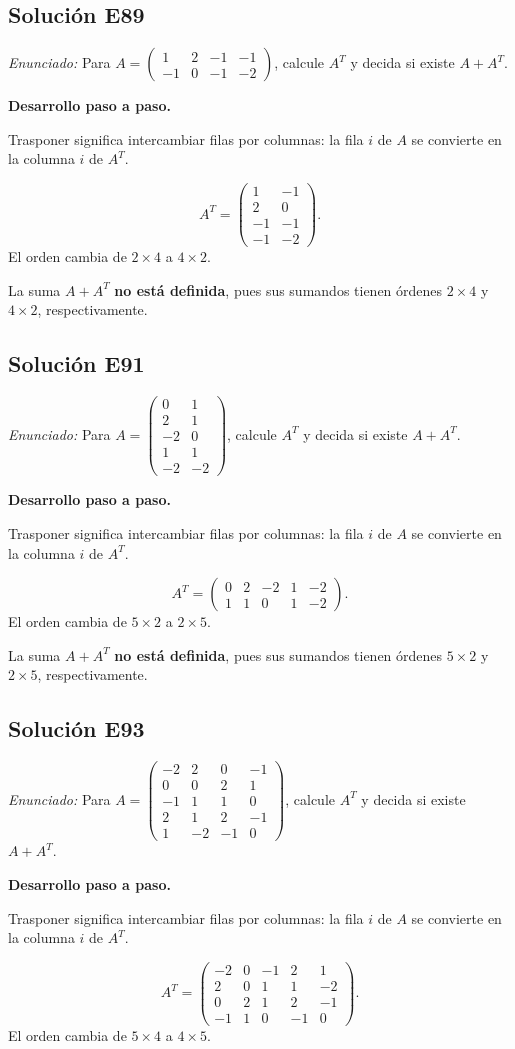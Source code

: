 \documentclass[12pt]{article}
\theoremstyle{remark}
\newcommand{\solucion}[2]{\Needspace{11\baselineskip}\subsection*{Solución E#1}\noindent\textit{Enunciado:} #2\par\medskip\noindent\textbf{Desarrollo paso a paso.}\par\medskip}
\begin{document}
\medskip

\solucion{89}{Para $A=\begin{pmatrix}1&2&-1&-1\\-1&0&-1&-2\end{pmatrix}$, calcule $A^T$ y decida si existe $A+A^T$.}
Trasponer significa intercambiar filas por columnas: la fila $i$ de $A$ se convierte en la columna $i$ de $A^T$.

\[
A^T=\begin{pmatrix}1&-1\\2&0\\-1&-1\\-1&-2\end{pmatrix}.
\]
El orden cambia de $2\times4$ a $4\times2$.

La suma $A+A^T$ \textbf{no está definida}, pues sus sumandos tienen órdenes $2\times4$ y $4\times2$, respectivamente.


\medskip

\solucion{91}{Para $A=\begin{pmatrix}0&1\\2&1\\-2&0\\1&1\\-2&-2\end{pmatrix}$, calcule $A^T$ y decida si existe $A+A^T$.}
Trasponer significa intercambiar filas por columnas: la fila $i$ de $A$ se convierte en la columna $i$ de $A^T$.

\[
A^T=\begin{pmatrix}0&2&-2&1&-2\\1&1&0&1&-2\end{pmatrix}.
\]
El orden cambia de $5\times2$ a $2\times5$.

La suma $A+A^T$ \textbf{no está definida}, pues sus sumandos tienen órdenes $5\times2$ y $2\times5$, respectivamente.


\medskip

\solucion{93}{Para $A=\begin{pmatrix}-2&2&0&-1\\0&0&2&1\\-1&1&1&0\\2&1&2&-1\\1&-2&-1&0\end{pmatrix}$, calcule $A^T$ y decida si existe $A+A^T$.}
Trasponer significa intercambiar filas por columnas: la fila $i$ de $A$ se convierte en la columna $i$ de $A^T$.

\[
A^T=\begin{pmatrix}-2&0&-1&2&1\\2&0&1&1&-2\\0&2&1&2&-1\\-1&1&0&-1&0\end{pmatrix}.
\]
El orden cambia de $5\times4$ a $4\times5$.
\end{document}
